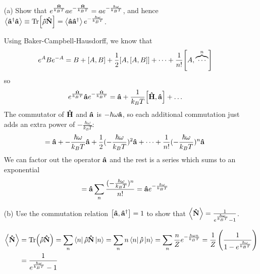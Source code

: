 \documentclass[a4paper,twoside]{article}
\begin{document}
\begin{itemize}
    \item[(a)] Show that $ e^{\frac{ \vu{H}}{k_B T}} a e^{- \frac{ \vu{H}}{k_B T}} = a e^{- \frac{\hbar \omega}{k_B T}} $, and hence $ \ev{ \vu{a}^\dagger \vu{a}} \equiv \Tr[\vu{\rho}\vu{N}] = \ev{ \vu{a} \vu{a}^\dagger} e^{- \frac{\hbar \omega}{k_B T}} $.
        \begin{problem}
            Using Baker-Campbell-Hausdorff, we know that
            \begin{equation}
                e^{A} B e^{-A} = B + \comm{A}{B} + \frac{1}{2} \comm{A}{\comm{A}{B}} + \cdots + \frac{1}{n!} \comm{A}{\overbrace{\cdots}^{n}}
            \end{equation}
            so
            \begin{equation}
                e^{ \frac{\vu{H}}{k_B T}} \vu{a} e^{- \frac{\vu{H}}{k_B T}} = \vu{a} + \frac{1}{k_B T} \comm{ \vu{H}}{ \vu{a}} + \ldots
            \end{equation}
            The commutator of $ \vu{H} $ and $ \vu{a} $ is $ - \hbar \omega \vu{a} $, so each additional commutation just adds an extra power of $ - \frac{\hbar \omega}{k_BT} $:
            \begin{equation}
                = \vu{a} + - \frac{\hbar \omega}{k_BT} \vu{a} + \frac{1}{2} (- \frac{\hbar \omega}{k_BT})^2 \vu{a} + \cdots + \frac{1}{n!} (- \frac{\hbar \omega}{k_BT})^n \vu{a}
            \end{equation}
            We can factor out the operator $ \vu{a} $ and the rest is a series which sums to an exponential
            \begin{equation}
                = \vu{a} \sum_n \frac{(- \frac{\hbar \omega}{k_B T})^n}{n!} = \vu{a} e^{- \frac{\hbar \omega}{k_B T}}
            \end{equation}
        \end{problem}
    \item[(b)] Use the commutation relation $ \comm{ \vu{a}}{ \vu{a}^\dagger} = 1 $ to show that $ \ev{ \vu{N}} = \frac{1}{e^{\frac{\hbar \omega}{k_B T}} - 1} $.
        \begin{problem}
            \begin{align}
                \ev{ \vu{N}} &= \Tr( \vu{\rho} \vu{N}) = \sum_n\bra{n} \vu{\rho} \vu{N}\ket{n} = \sum_n n\bra{n} \vu{\rho}\ket{n} = \sum_n \frac{n}{Z} e^{- \frac{\hbar \omega n}{k_BT}} = \frac{1}{Z} \left( \frac{1}{1 - e^{\frac{\hbar \omega}{k_BT}}} \right) \\ &= \frac{1}{e^{\frac{\hbar \omega}{k_BT}} -1}
            \end{align}
        \end{problem}
\end{itemize}
\end{document}
